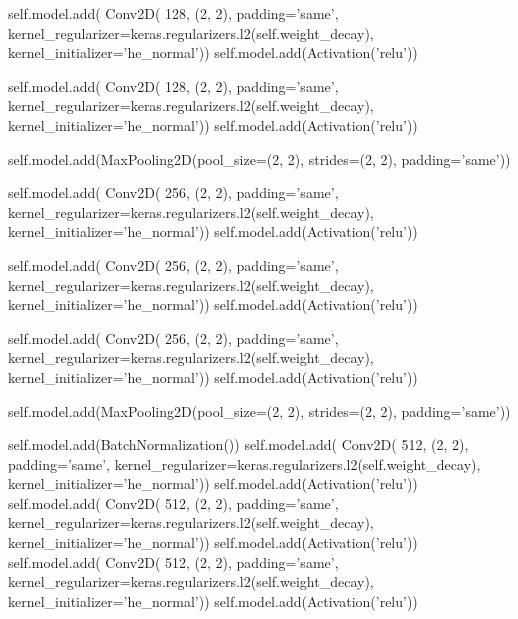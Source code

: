 \begin{appendices}
\begin{python}
        self.model.add(
            Conv2D(
                128,
                (2, 2),
                padding='same',
                kernel_regularizer=keras.regularizers.l2(self.weight_decay),
                kernel_initializer='he_normal'))
        self.model.add(Activation('relu'))

        self.model.add(
            Conv2D(
                128,
                (2, 2),
                padding='same',
                kernel_regularizer=keras.regularizers.l2(self.weight_decay),
                kernel_initializer='he_normal'))
        self.model.add(Activation('relu'))

        self.model.add(MaxPooling2D(pool_size=(2, 2),
                                    strides=(2, 2),
                                    padding='same'))

        self.model.add(
            Conv2D(
                256,
                (2, 2),
                padding='same',
                kernel_regularizer=keras.regularizers.l2(self.weight_decay),
                kernel_initializer='he_normal'))
        self.model.add(Activation('relu'))

        self.model.add(
            Conv2D(
                256,
                (2, 2),
                padding='same',
                kernel_regularizer=keras.regularizers.l2(self.weight_decay),
                kernel_initializer='he_normal'))
        self.model.add(Activation('relu'))

        self.model.add(
            Conv2D(
                256,
                (2, 2),
                padding='same',
                kernel_regularizer=keras.regularizers.l2(self.weight_decay),
                kernel_initializer='he_normal'))
        self.model.add(Activation('relu'))

        self.model.add(MaxPooling2D(pool_size=(2, 2),
                                    strides=(2, 2),
                                    padding='same'))

        self.model.add(BatchNormalization())
        self.model.add(
            Conv2D(
                512,
                (2, 2),
                padding='same',
                kernel_regularizer=keras.regularizers.l2(self.weight_decay),
                kernel_initializer='he_normal'))
        self.model.add(Activation('relu'))
        self.model.add(
            Conv2D(
                512,
                (2, 2),
                padding='same',
                kernel_regularizer=keras.regularizers.l2(self.weight_decay),
                kernel_initializer='he_normal'))
        self.model.add(Activation('relu'))
        self.model.add(
            Conv2D(
                512,
                (2, 2),
                padding='same',
                kernel_regularizer=keras.regularizers.l2(self.weight_decay),
                kernel_initializer='he_normal'))
        self.model.add(Activation('relu'))


\end{python}
\end{appendices}
